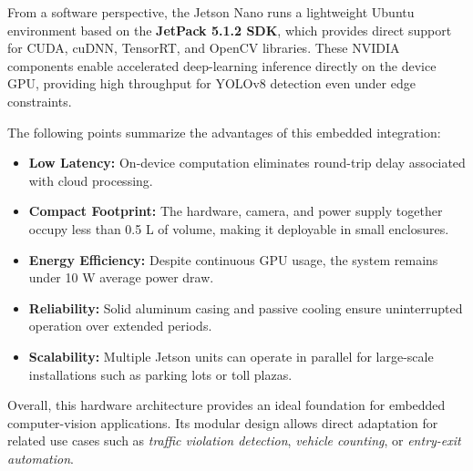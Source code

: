 \noindent
From a software perspective, the Jetson Nano runs a lightweight Ubuntu environment based on the \textbf{JetPack 5.1.2 SDK}, which provides direct support for CUDA, cuDNN, TensorRT, and OpenCV libraries.  
These NVIDIA components enable accelerated deep-learning inference directly on the device GPU, providing high throughput for YOLOv8 detection even under edge constraints.

\noindent
The following points summarize the advantages of this embedded integration:
\begin{itemize}
	\item \textbf{Low Latency:} On-device computation eliminates round-trip delay associated with cloud processing.  
	\item \textbf{Compact Footprint:} The hardware, camera, and power supply together occupy less than 0.5 L of volume, making it deployable in small enclosures.  
	\item \textbf{Energy Efficiency:} Despite continuous GPU usage, the system remains under 10 W average power draw.  
	\item \textbf{Reliability:} Solid aluminum casing and passive cooling ensure uninterrupted operation over extended periods.  
	\item \textbf{Scalability:} Multiple Jetson units can operate in parallel for large-scale installations such as parking lots or toll plazas.  
\end{itemize}

\noindent
Overall, this hardware architecture provides an ideal foundation for embedded computer-vision applications.  
Its modular design allows direct adaptation for related use cases such as \textit{traffic violation detection}, \textit{vehicle counting}, or \textit{entry-exit automation}.  
